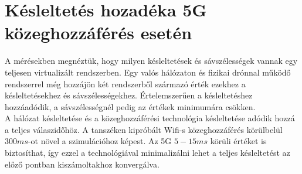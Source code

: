 \section{Késleltetés hozadéka 5G közeghozzáférés esetén}
A mérésekben megnéztük, hogy milyen késleltetések és sávszélességek vannak egy teljesen virtualizált rendszerben. Egy valós hálózaton és fizikai drónnal működő rendszerrel még hozzájön két rendszerből származó érték ezekhez a késleltetésekhez és sávszélességekhez. Értelemszerűen a késleltetéshez hozzáadódik, a sávszélességnél pedig az értékek minimumára csökken. \\

\noindent
A hálózat késleltetése és a közeghozzáférési technológia késleltetése adódik hozzá a teljes válaszidőhöz. A tanszéken kipróbált Wifi-s közeghozzáférés körülbelül $300 ms$-ot növel a szimulációhoz képest. Az 5G $5-15 ms$ körüli értéket is biztosíthat, így ezzel a technológiával minimalizálni lehet a teljes késleltetést az előző pontban kiszámoltakhoz konvergálva.